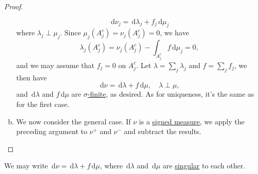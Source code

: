 \begin{proof}
\begin{enumerate}[(a)]
		      \[
			      \,\mathrm{d} \nu _{j} = \,\mathrm{d} \lambda _{j} + f_{j} \,\mathrm{d} \mu _{j}
		      \]
		      where \(\lambda _{j} \perp \mu _{j} \). Since \(\mu _{j} (A^{c} _{j} ) = \nu _{j} (A^{c} _{j} ) = 0\), we have
		      \[
			      \lambda _{j} (A^{c} _{j} ) = \nu _{j} (A^{c} _{j} )- \int _{A^{c} _{j} }f \,\mathrm{d} \mu _{j} = 0,
		      \]
		      and we may assume that \(f_{j} = 0\) on \(A^{c} _{j} \). Let \(\lambda = \sum_j \lambda _{j} \) and \(f = \sum_{j}f_{j}  \), we then have
		      \[
			      \,\mathrm{d} \nu = \,\mathrm{d} \lambda + f \,\mathrm{d} \mu , \quad \lambda \perp \mu ,
		      \]
		      and \(\,\mathrm{d} \lambda \) and \(f \,\mathrm{d} \mu \) are \hyperref[def:finite-signed-measure]{\(\sigma \)-finite}, as desired. As for uniqueness, it's the same as for the first case.
		\item We now consider the general case. If \(\nu\) is a \hyperref[def:signed-measure]{signed measure}, we apply the preceding argument to \(\nu ^+\) and \(\nu ^-\) and subtract the results.
	\end{enumerate}
\end{proof}

\begin{notation}
	We may write \(\,\mathrm{d} \nu = \,\mathrm{d} \lambda + f \,\mathrm{d} \mu\), where \(\,\mathrm{d} \lambda\) and \(\,\mathrm{d} \mu\) are \hyperref[def:singular]{singular} to each other.
\end{notation}